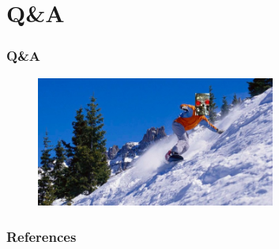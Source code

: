 \documentclass{beamer}
\begin{document}

\section*{Q\&A}

\begin{frame}
  \frametitle{Q\&A}
  \begin{figure}
    \centering
    \includegraphics[width=0.7\textwidth]{gradient_descent.jpg}
  \end{figure}
\end{frame}


\begin{frame}[allowframebreaks]
\frametitle{References}
\footnotesize


\end{frame}
\end{document}
